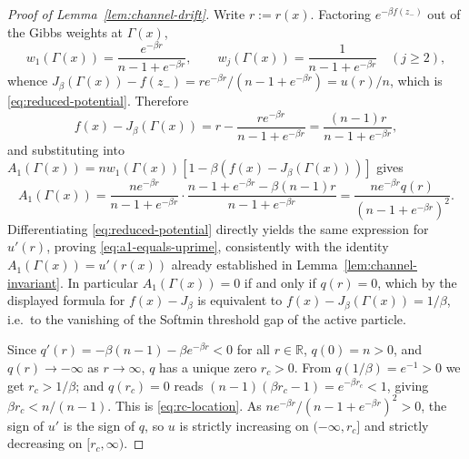 \documentclass{article} %
\theoremstyle{plain}
\theoremstyle{definition}
\theoremstyle{remark}
\newcommand{\prefactor}[2]{A_{#1}(#2)}
\newcommand{\R}{\mathbb{R}}
\begin{document}
\begin{proof}[Proof of Lemma~\ref{lem:channel-drift}]
    Write $r:=r(x)$. Factoring $e^{-\beta f(z_-)}$ out of the Gibbs weights at $\Gamma(x)$,
    \[
        w_1(\Gamma(x))=\frac{e^{-\beta r}}{n-1+e^{-\beta r}}, \qquad w_j(\Gamma(x))=\frac{1}{n-1+e^{-\beta r}} \quad (j\ge2),
    \]
    whence $J_\beta(\Gamma(x))-f(z_-)=re^{-\beta r}/(n-1+e^{-\beta r})=u(r)/n$, which is \eqref{eq:reduced-potential}. Therefore
    \[
        f(x)-J_\beta(\Gamma(x)) = r-\frac{re^{-\beta r}}{n-1+e^{-\beta r}} = \frac{(n-1)r}{n-1+e^{-\beta r}},
    \]
    and substituting into $\prefactor{1}{\Gamma(x)}=nw_1(\Gamma(x))[1-\beta(f(x)-J_\beta(\Gamma(x)))]$ gives
    \[
        \prefactor{1}{\Gamma(x)} = \frac{ne^{-\beta r}}{n-1+e^{-\beta r}}\cdot\frac{n-1+e^{-\beta r}-\beta(n-1)r}{n-1+e^{-\beta r}} = \frac{ne^{-\beta r}q(r)}{(n-1+e^{-\beta r})^2}.
    \]
    Differentiating \eqref{eq:reduced-potential} directly yields the same expression for $u'(r)$, proving \eqref{eq:a1-equals-uprime}, consistently with the identity $\prefactor{1}{\Gamma(x)}=u'(r(x))$ already established in Lemma~\ref{lem:channel-invariant}. In particular $\prefactor{1}{\Gamma(x)}=0$ if and only if $q(r)=0$, which by the displayed formula for $f(x)-J_\beta$ is equivalent to $f(x)-J_\beta(\Gamma(x))=1/\beta$, i.e.\ to the vanishing of the Softmin threshold gap of the active particle.

    Since $q'(r)=-\beta(n-1)-\beta e^{-\beta r}<0$ for all $r\in\R$, $q(0)=n>0$, and $q(r)\to-\infty$ as $r\to\infty$, $q$ has a unique zero $r_c>0$. From $q(1/\beta)=e^{-1}>0$ we get $r_c>1/\beta$; and $q(r_c)=0$ reads $(n-1)(\beta r_c-1)=e^{-\beta r_c}<1$, giving $\beta r_c<n/(n-1)$. This is \eqref{eq:rc-location}. As $ne^{-\beta r}/(n-1+e^{-\beta r})^2>0$, the sign of $u'$ is the sign of $q$, so $u$ is strictly increasing on $(-\infty,r_c]$ and strictly decreasing on $[r_c,\infty)$.
\end{proof}
\end{document}
